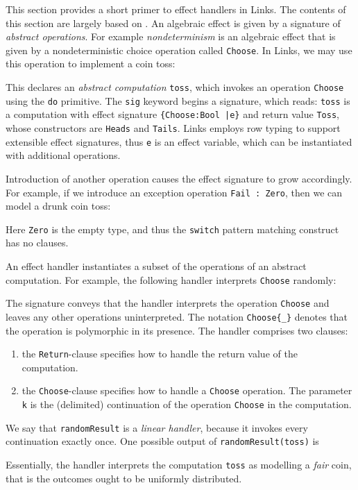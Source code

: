 \documentclass[mscres,cdtppar,twoside,openright,logo,rightchapter,normalheadings]{infthesis}
\theoremstyle{definition}
\begin{document}
This section provides a short primer to effect handlers in Links. The
contents of this section are largely based on
\cite{Hillerstrom2016b}. An algebraic effect is given by a signature
of \emph{abstract operations}. For example \emph{nondeterminism} is an
algebraic effect that is given by a nondeterministic choice operation
called \lstinline$Choose$. In Links, we may use this operation to
implement a coin toss:
%

%
This declares an \emph{abstract computation} \lstinline$toss$, which
invokes an operation \lstinline$Choose$ using the \lstinline$do$
primitive.  The \lstinline$sig$ keyword begins a signature, which
reads: \lstinline$toss$ is a computation with effect signature
\lstinline${Choose:Bool |e}$ and return value \lstinline$Toss$, whose
constructors are \lstinline$Heads$ and \lstinline$Tails$.  Links
employs row typing to support extensible effect signatures, thus
\lstinline$e$ is an effect variable, which can be instantiated with
additional operations.

Introduction of another operation causes the effect signature to grow
accordingly. For example, if we introduce an exception operation
\lstinline$Fail : Zero$, then we can model a drunk coin toss:
%

%
Here \lstinline$Zero$ is the empty type, and thus the
\lstinline$switch$ pattern matching construct has no clauses.

An effect handler instantiates a subset of the operations of an
abstract computation. For example, the following handler interprets
\lstinline$Choose$ randomly:
%

%
The signature conveys that the handler interprets the operation
\lstinline$Choose$ and leaves any other operations uninterpreted. The
notation \lstinline$Choose{_}$ denotes that the operation is
polymorphic in its presence.  The handler comprises two clauses:
\begin{enumerate}[1)]
  \item the \lstinline$Return$-clause specifies how to handle the return
    value of the computation.
  \item the \lstinline$Choose$-clause specifies how to handle a
    \lstinline$Choose$ operation. The parameter \lstinline$k$ is the
    (delimited) continuation of the operation \lstinline$Choose$ in the
    computation.
\end{enumerate}
We say that \lstinline$randomResult$ is a \emph{linear handler},
because it invokes every continuation exactly once. One possible
output of \lstinline$randomResult(toss)$ is
%

%
Essentially, the handler interprets the computation \lstinline$toss$
as modelling a \emph{fair} coin, that is the outcomes ought to be
uniformly distributed.
\end{document}

